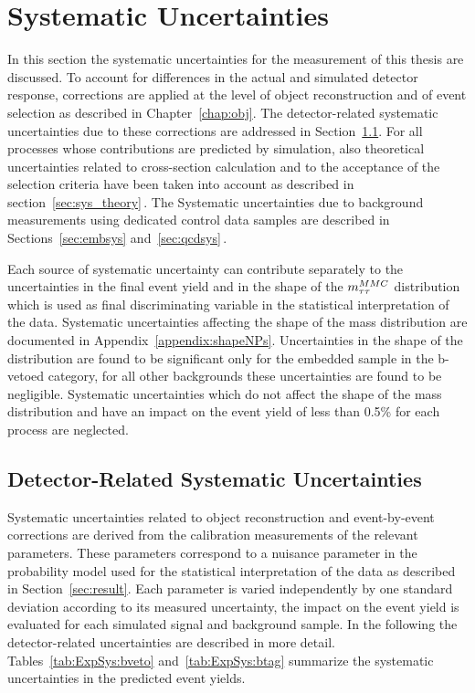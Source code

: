 \section{Systematic Uncertainties}
\label{sec:Systematics}

In this section the systematic uncertainties for the measurement of this thesis are discussed.
To account for differences in the actual and simulated detector response, corrections are applied at the level of
object reconstruction  and of event selection as described in Chapter~\ref{chap:obj}. 
The detector-related systematic uncertainties due to these corrections are addressed in Section~\ref{sec:sys:sys_det}. 
For all processes whose contributions are predicted by simulation, also theoretical
uncertainties related to cross-section calculation and to the acceptance of the selection criteria 
have been taken into account as  described in section~\ref{sec:sys_theory}$\,.$
The Systematic uncertainties due to  background measurements using dedicated control data samples
are described in Sections~\ref{sec:embsys} and~\ref{sec:qcdsys}$\,.$

Each source of systematic uncertainty can contribute separately to the uncertainties in the
final event yield and in the shape of the $m_{\tau\tau}^{MMC}$
distribution which is used as final discriminating variable in the statistical interpretation of the data. Systematic uncertainties
affecting the shape of the mass distribution are
documented in Appendix~\ref{appendix:shapeNPs}. Uncertainties in the shape of the \mmc  distribution 
are found to be significant only for the embedded sample in the b-vetoed category,
for all other  backgrounds these uncertainties are found to be negligible.
Systematic uncertainties which do not affect the
shape of the mass distribution and have an impact on the event yield of less than 0.5\% for each process are 
neglected.


\subsection{Detector-Related Systematic Uncertainties}
\label{sec:sys:sys_det}
Systematic uncertainties related to object reconstruction and event-by-event 
corrections are derived from the calibration measurements of the relevant parameters. These 
parameters correspond to a nuisance parameter in the probability model used for the  statistical interpretation
of the data as described in Section~\ref{sec:result}.
Each parameter is varied independently by one standard deviation  according to its measured
uncertainty, the impact on the event  yield is evaluated for each simulated signal and background sample.
In the following the detector-related uncertainties are  described in more detail.
Tables~\ref{tab:ExpSys:bveto} and~\ref{tab:ExpSys:btag}  summarize the systematic uncertainties in the 
predicted event yields. 



